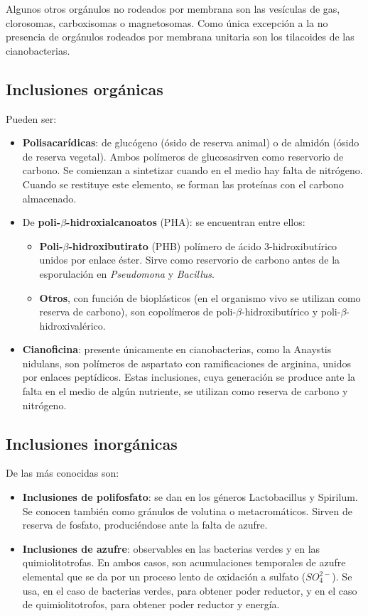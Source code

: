 \documentclass[10pt,a4paper,onecolumn,openany]{book}
\begin{document}
Algunos otros orgánulos no rodeados por membrana son las vesículas de gas, clorosomas, carboxisomas o magnetosomas. Como única excepción a la no presencia de orgánulos rodeados por membrana unitaria son los tilacoides de las cianobacterias.
\subsection{Inclusiones orgánicas}
Pueden ser:
\begin{itemize}[itemsep=0pt,parsep=0pt,topsep=0pt,partopsep=0pt]
	\item \textbf{Polisacarídicas}: de glucógeno (ósido de reserva animal) o de almidón (ósido de reserva vegetal). Ambos polímeros de glucosasirven como reservorio de carbono. Se comienzan a sintetizar cuando en el medio hay falta de nitrógeno. Cuando se restituye este elemento, se forman las proteínas con el carbono almacenado.
	\item De \textbf{poli-$\beta$-hidroxialcanoatos} (PHA): se encuentran entre ellos:
	\begin{itemize}[itemsep=0pt,parsep=0pt,topsep=0pt,partopsep=0pt]
		\item \textbf{Poli-$\beta$-hidroxibutirato} (PHB) polímero de ácido 3-hidroxibutírico unidos por enlace éster. Sirve como reservorio de carbono antes de la esporulación en \textit{Pseudomona} y \textit{Bacillus}.
		\item \textbf{Otros}, con función de bioplásticos (en el organismo vivo se utilizan como reserva de carbono), son copolímeros de poli-$\beta$-hidroxibutírico y poli-$\beta$-hidroxivalérico.
	\end{itemize}
	\item \textbf{Cianoficina}: presente únicamente en cianobacterias, como la Anaystis nidulans, son polímeros de aspartato con ramificaciones de arginina, unidos por enlaces peptídicos. Estas inclusiones, cuya generación se produce ante la falta en el medio de algún nutriente, se utilizan como reserva de carbono y nitrógeno.
\end{itemize}
\subsection{Inclusiones inorgánicas}
De las más conocidas son:
\begin{itemize}[itemsep=0pt,parsep=0pt,topsep=0pt,partopsep=0pt]
	\item \textbf{Inclusiones de polifosfato}: se dan en los géneros Lactobacillus y Spirilum. Se conocen también como gránulos de volutina o metacromáticos. Sirven de reserva de fosfato, produciéndose ante la falta de azufre.
	\item \textbf{Inclusiones de azufre}: observables en las bacterias verdes y en las quimiolitotrofas. En ambos casos, son acumulaciones temporales de azufre elemental que se da por un proceso lento de oxidación a sulfato ($SO_4^{2-}$). Se usa, en el caso de bacterias verdes, para obtener poder reductor, y en el caso de quimiolitotrofos, para obtener poder reductor y energía.
\end{itemize}
\end{document}
